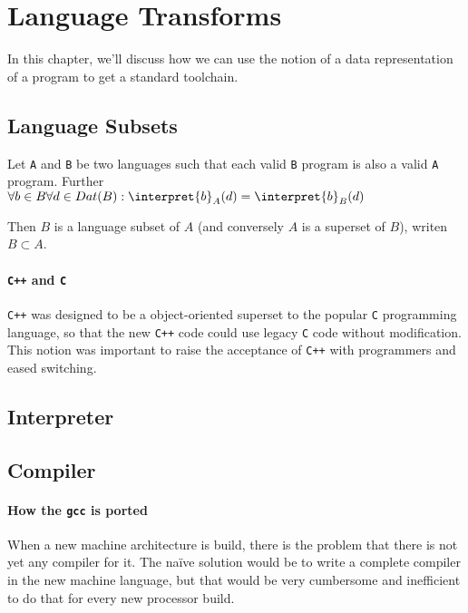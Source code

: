 \section{Language Transforms} %
\label{sec:transforms}
In this chapter, we'll discuss how we can use the notion of a data 
representation of a program to get a standard toolchain.
\subsection{Language Subsets} %
\label{sub:Language Subsets}
\begin{defn}
	Let {\tt A} and {\tt B} be two languages such that each valid {\tt B} 
	program is also a valid {\tt A} program. Further 
	$\forall b\in B\forall d\in Dat(B): \interpret{b}_A(d) = \interpret{b}_B(d)$

	Then $B$ is a language subset of $A$ (and conversely $A$ is a superset of
	$B$), writen $B \subset A$.
\end{defn}
\paragraph{{\tt C++}  and {\tt C} } %
\label{par:Cpp and C}
{\tt C++} was designed to be a object-oriented superset to the popular {\tt C}
programming language, so that the new {\tt C++} code could use legacy {\tt C}
code without modification. This notion was important to raise the acceptance of
{\tt C++} with programmers and eased switching.
\subsection{Interpreter} %
\label{sub:Interpreter}

\subsection{Compiler} %
\label{sub:Compiler}
\paragraph{How the {\tt gcc} is ported} %
\label{par:gcc}
When a new machine architecture is build, there is the problem that there is 
not yet any compiler for it. The naïve solution would be to write a complete 
compiler in the new machine language, but that would be very cumbersome and 
inefficient to do that for every new processor build.


